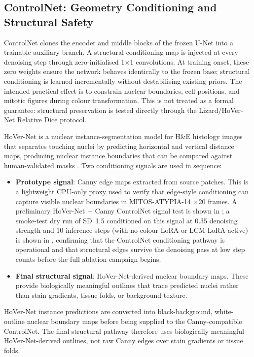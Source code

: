 \documentclass[a4paper,twoside,12pt]{report}
\begin{document}
\subsection{ControlNet: Geometry Conditioning and Structural Safety}

ControlNet \citep{zhang2023controlnet} clones the encoder and middle blocks of the frozen U-Net into a trainable auxiliary branch. A structural conditioning map is injected at every denoising step through zero-initialised 1$\times$1 convolutions. At training onset, these zero weights ensure the network behaves identically to the frozen base; structural conditioning is learned incrementally without destabilising existing priors. The intended practical effect is to constrain nuclear boundaries, cell positions, and mitotic figures during colour transformation. This is not treated as a formal guarantee: structural preservation is tested directly through the Lizard/HoVer-Net Relative Dice protocol.

HoVer-Net is a nuclear instance-segmentation model for H\&E histology images that separates touching nuclei by predicting horizontal and vertical distance maps, producing nuclear instance boundaries that can be compared against human-validated masks \citep{graham2019hovernet}. Two conditioning signals are used in sequence:

\begin{itemize}
    \item \textbf{Prototype signal}: Canny edge maps extracted from source patches. This is a lightweight CPU-only proxy used to verify that edge-style conditioning can capture visible nuclear boundaries in MITOS-ATYPIA-14 $\times$20 frames. A preliminary HoVer-Net + Canny ControlNet signal test is shown in ; a smoke-test dry run of SD~1.5 conditioned on this signal at 0.35 denoising strength and 10 inference steps (with no colour LoRA or LCM-LoRA active) is shown in , confirming that the ControlNet conditioning pathway is operational and that structural edges survive the denoising pass at low step counts before the full ablation campaign begins.
    \item \textbf{Final structural signal}: HoVer-Net-derived nuclear boundary maps. These provide biologically meaningful outlines that trace predicted nuclei rather than stain gradients, tissue folds, or background texture.
\end{itemize}

HoVer-Net instance predictions are converted into black-background, white-outline nuclear boundary maps before being supplied to the Canny-compatible ControlNet. The final structural pathway therefore uses biologically meaningful HoVer-Net-derived outlines, not raw Canny edges over stain gradients or tissue folds.
\end{document}
